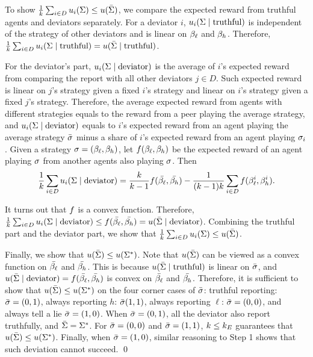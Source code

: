 To show $\frac{1}{k} \sum_{i \in D} u_i(\Sigma) \le u(\bar{\Sigma})$, we compare the expected reward from truthful agents and deviators separately. For a deviator $i$, $u_i(\Sigma \mid \text{truthful})$ is independent of the strategy of other deviators and is linear on $\beta_{\ell}$ and $\beta_{h}$. Therefore, $\frac{1}{k} \sum_{i \in D} u_i(\Sigma \mid  \text{truthful}) = u(\bar{\Sigma} \mid \text{truthful})$. 

For the deviator's part, $u_i(\Sigma \mid \text{deviator})$ is the average of $i$'s expected reward from comparing the report with all other deviators $j \in D$. Such expected reward is linear on $j$'s strategy given a fixed $i$'s strategy and linear on $i$'s strategy given a fixed $j$'s strategy. Therefore, the average expected reward from agents with different strategies equals to the reward from a peer playing the average strategy, and $u_i(\Sigma \mid \text{deviator})$ equals to $i$'s expected reward from an agent playing the average strategy $\bar{\sigma}$ minus a share of $i$'s expected reward from an agent playing $\sigma_i$. Given a strategy $\sigma = (\beta_{\ell}, \beta_{h})$, let $f(\beta_{\ell}, \beta_{h})$ be the expected reward of an agent playing $\sigma$ from another agents also playing $\sigma$. Then
\begin{equation*}
    \frac{1}{k}\sum_{i \in D} u_i(\Sigma\mid \text{deviator}) = \frac{k}{k-1} f(\bar{\beta_{\ell}}, \bar{\beta_{h}}) - \frac{1}{(k-1)k} \sum_{i\in D} f(\beta_{\ell}^i, \beta_{h}^i).
\end{equation*}

It turns out that $f$ is a convex function. Therefore, $ \frac{1}{k}\sum_{i \in D} u_i(\Sigma\mid \text{deviator}) \le f(\bar{\beta_{\ell}}, \bar{\beta_{h}}) = u(\bar{\Sigma} \mid \text{deviator})$. Combining the truthful part and the deviator part, we show that $\frac{1}{k} \sum_{i \in D} u_i(\Sigma) \le u(\bar{\Sigma})$. 

Finally, we show that $u(\bar{\Sigma}) \le u(\Sigma^*)$. Note that $u(\bar{\Sigma})$ can be viewed as a convex function on $\bar{\beta_{\ell}}$ and $\bar{\beta_{h}}$. This is because $u(\bar{\Sigma} \mid \text{truthful})$ is linear on $\bar{\sigma}$, and $u(\bar{\Sigma} \mid \text{deviator}) = f(\bar{\beta_{\ell}}, \bar{\beta_{h}})$ is convex on $\bar{\beta_{\ell}}$ and $\bar{\beta_{h}}$. Therefore, it is sufficient to show that $u(\bar{\Sigma}) \le u(\Sigma^*)$ on the four corner cases of $\bar{\sigma}$: truthful reporting: $\bar{\sigma} = (0, 1)$, always reporting $h$: $ \bar{\sigma}(1,1)$, always reporting $\ell$: $\bar{\sigma} = (0, 0)$, and always tell a lie $\bar{\sigma} = (1, 0)$. 
When $\bar{\sigma} = (0, 1)$, all the deviator also report truthfully, and $\bar{\Sigma} = \Sigma^*$. For $\bar{\sigma} = (0, 0)$ and $\bar{\sigma} = (1, 1)$, $k \le k_E$ guarantees that $u(\bar{\Sigma}) \le u(\Sigma^*)$. Finally, when $\bar{\sigma} = (1, 0)$, similar reasoning to Step 1 shows that such deviation cannot succeed. \qed

